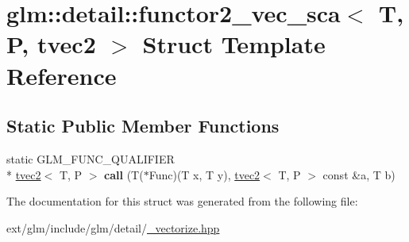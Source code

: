 \hypertarget{structglm_1_1detail_1_1functor2__vec__sca_3_01_t_00_01_p_00_01tvec2_01_4}{\section{glm\-:\-:detail\-:\-:functor2\-\_\-vec\-\_\-sca$<$ T, P, tvec2 $>$ Struct Template Reference}
\label{structglm_1_1detail_1_1functor2__vec__sca_3_01_t_00_01_p_00_01tvec2_01_4}
}
\subsection*{Static Public Member Functions}
\begin{DoxyCompactItemize}
\item 
\hypertarget{structglm_1_1detail_1_1functor2__vec__sca_3_01_t_00_01_p_00_01tvec2_01_4_ad640cc49fdd9c6451bff02195a618c55}{static G\-L\-M\-\_\-\-F\-U\-N\-C\-\_\-\-Q\-U\-A\-L\-I\-F\-I\-E\-R \\*
\hyperlink{structglm_1_1tvec2}{tvec2}$<$ T, P $>$ {\bfseries call} (T($\ast$Func)(T x, T y), \hyperlink{structglm_1_1tvec2}{tvec2}$<$ T, P $>$ const \&a, T b)}\label{structglm_1_1detail_1_1functor2__vec__sca_3_01_t_00_01_p_00_01tvec2_01_4_ad640cc49fdd9c6451bff02195a618c55}

\end{DoxyCompactItemize}


The documentation for this struct was generated from the following file\-:\begin{DoxyCompactItemize}
\item 
ext/glm/include/glm/detail/\hyperlink{__vectorize_8hpp}{\-\_\-vectorize.\-hpp}\end{DoxyCompactItemize}

